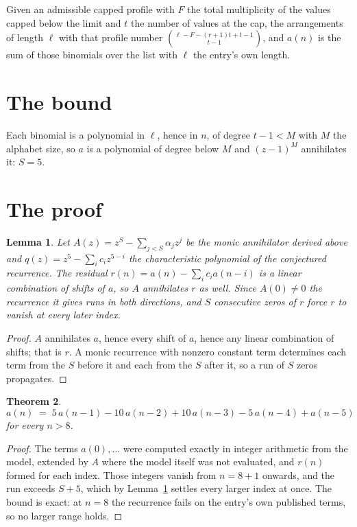 \documentclass[11pt,a4paper]{article}
\theoremstyle{plain}
\newtheorem{theorem}{Theorem}
\newtheorem{lemma}[theorem]{Lemma}
\theoremstyle{definition}
\begin{document}
Given an admissible capped profile with $F$ the total multiplicity of the values capped below
the limit and $t$ the number of values at the cap, the arrangements of length $\ell$ with that
profile number $\binom{\ell-F-(r+1)t+t-1}{t-1}$, and $a(n)$ is the sum of those binomials
over the list with $\ell$ the entry's own length.

\section{The bound}

Each binomial is a polynomial in $\ell$, hence in $n$, of degree $t-1<M$ with $M$ the alphabet
size, so $a$ is a polynomial of degree below $M$ and $(z-1)^{M}$ annihilates it: $S=5$.

\section{The proof}

\begin{lemma}\label{lem:crit}
Let $A(z)=z^S-\sum_{j<S}\alpha_jz^{j}$ be the monic annihilator derived above and
$q(z)=z^{5}-\sum_ic_iz^{5-i}$ the characteristic polynomial of the conjectured
recurrence. The residual $r(n)=a(n)-\sum_ic_ia(n-i)$ is a linear combination of shifts of $a$,
so $A$ annihilates $r$ as well. Since $A(0)\ne0$ the recurrence it gives runs in both
directions, and $S$ consecutive zeros of $r$ force $r$ to vanish at every later index.
\end{lemma}

\begin{proof}
$A$ annihilates $a$, hence every shift of $a$, hence any linear combination of shifts; that is
$r$. A monic recurrence with nonzero constant term determines each term from the $S$ before it
and each from the $S$ after it, so a run of $S$ zeros propagates.
\end{proof}

\begin{theorem}
\[
a(n)\;=\;5\,a(n-1) - 10\,a(n-2) + 10\,a(n-3) - 5\,a(n-4) + a(n-5)
\]
for every $n>8$.
\end{theorem}

\begin{proof}
The terms $a(0),\dots$ were computed exactly in integer arithmetic from the model, extended by
$A$ where the model itself was not evaluated, and $r(n)$ formed for each index. Those integers
vanish from $n=8+1$ onwards, and the run exceeds $S+5$, which by
Lemma~\ref{lem:crit} settles every larger index at once. The bound is exact: at $n=8$ the recurrence fails on the entry's own published terms, so no larger range holds.
\end{proof}
\end{document}
